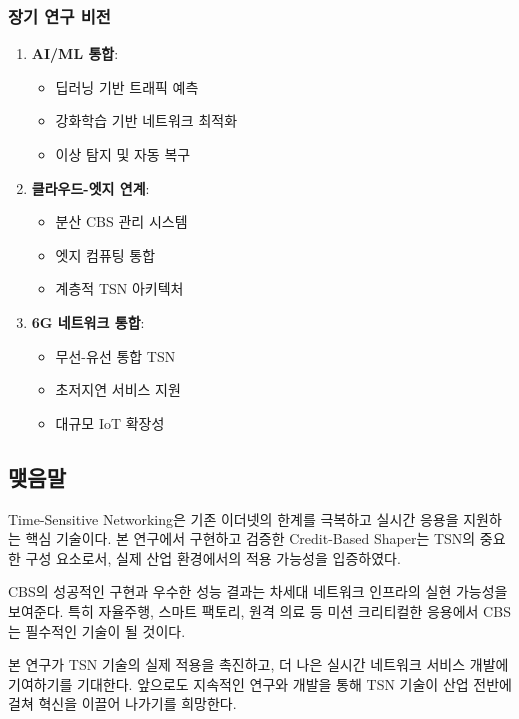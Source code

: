 \documentclass[twocolumn,10pt]{article}
\begin{document}
\subsubsection{장기 연구 비전}

\begin{enumerate}
    \item \textbf{AI/ML 통합}:
        \begin{itemize}
            \item 딥러닝 기반 트래픽 예측
            \item 강화학습 기반 네트워크 최적화
            \item 이상 탐지 및 자동 복구
        \end{itemize}
    
    \item \textbf{클라우드-엣지 연계}:
        \begin{itemize}
            \item 분산 CBS 관리 시스템
            \item 엣지 컴퓨팅 통합
            \item 계층적 TSN 아키텍처
        \end{itemize}
    
    \item \textbf{6G 네트워크 통합}:
        \begin{itemize}
            \item 무선-유선 통합 TSN
            \item 초저지연 서비스 지원
            \item 대규모 IoT 확장성
        \end{itemize}
\end{enumerate}

\subsection{맺음말}

Time-Sensitive Networking은 기존 이더넷의 한계를 극복하고 실시간 응용을 지원하는 핵심 기술이다. 본 연구에서 구현하고 검증한 Credit-Based Shaper는 TSN의 중요한 구성 요소로서, 실제 산업 환경에서의 적용 가능성을 입증하였다.

CBS의 성공적인 구현과 우수한 성능 결과는 차세대 네트워크 인프라의 실현 가능성을 보여준다. 특히 자율주행, 스마트 팩토리, 원격 의료 등 미션 크리티컬한 응용에서 CBS는 필수적인 기술이 될 것이다.

본 연구가 TSN 기술의 실제 적용을 촉진하고, 더 나은 실시간 네트워크 서비스 개발에 기여하기를 기대한다. 앞으로도 지속적인 연구와 개발을 통해 TSN 기술이 산업 전반에 걸쳐 혁신을 이끌어 나가기를 희망한다.
\end{document}
